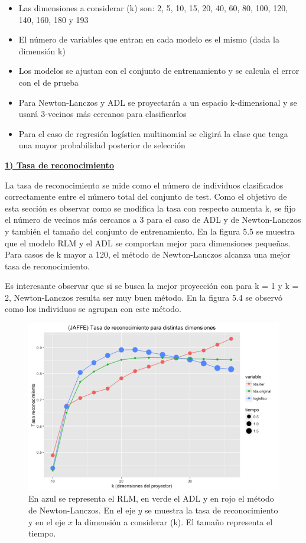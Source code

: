 \begin{itemize}
\item Las dimensiones a considerar (k) son: 2, 5, 10, 15, 20, 40, 60, 80, 100, 120, 140, 160, 180 y 193
\item El número de variables que entran en cada modelo es el mismo (dada la dimensión k)
\item Los modelos se ajustan con el conjunto de entrenamiento y se calcula el error con el de prueba
\item Para Newton-Lanczos y ADL se proyectarán a un espacio k-dimensional y se usará 3-vecinos más cercanos para clasificarlos
\item Para el caso de regresión logística multinomial se eligirá la clase que tenga una mayor probabilidad posterior de selección
\end{itemize}

\underline{\textbf{1) Tasa de reconocimiento}}

La tasa de reconocimiento se mide como el número de individuos clasificados correctamente entre el número total del conjunto de test. Como el objetivo de esta sección es observar como se modifica la tasa con respecto aumenta k, se fijo el número de vecinos más cercanos a 3 para el caso de ADL y de Newton-Lanczos y también el tamaño del conjunto de entrenamiento. En la figura 5.5 se muestra que el modelo RLM y el ADL se comportan mejor para dimensiones pequeñas. Para casos de k mayor a 120, el método de Newton-Lanczos alcanza una mejor tasa de reconocimiento.

Es interesante observar que si se busca la mejor proyección con para k = 1 y k = 2, Newton-Lanczos resulta ser muy buen método. En la figura 5.4 se observó como los individuos se agrupan con este método. 
\pagebreak

\begin{figure}[!ht]
  \centering
	\includegraphics[width=1\textwidth]{Figures/Chapter4_Comparacion.png}	
  \caption[Tasa de reconocimiento base (MNIST)]
  {En azul se representa el RLM, en verde el ADL y en rojo el método de Newton-Lanczos. En el eje $y$ se muestra la tasa de reconocimiento y en el eje $x$ la dimensión a considerar (k). El tamaño representa el tiempo.}
\end{figure}

